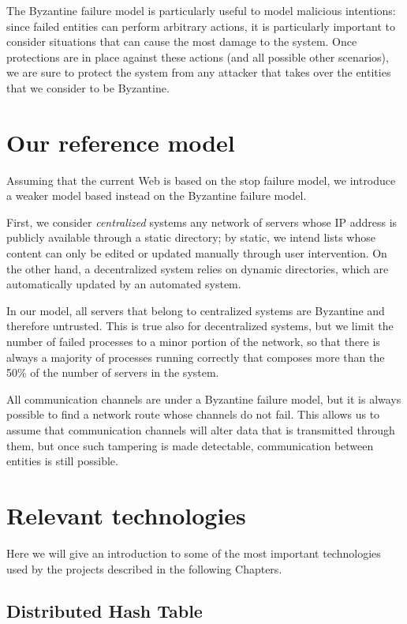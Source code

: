 \documentclass[mscthesis]{usiinfthesis}
\begin{document}
The Byzantine failure model is particularly useful to model malicious intentions: since failed entities can perform arbitrary actions, it is particularly important to consider situations that can cause the most damage to the system. Once protections are in place against these actions (and all possible other scenarios), we are sure to protect the system from any attacker that takes over the entities that we consider to be Byzantine.

\section{Our reference model}\label{sec:model}

Assuming that the current Web is based on the stop failure model, we introduce a weaker model based instead on the Byzantine failure model.

First, we consider \emph{centralized} systems any network of servers whose IP address is publicly available through a static directory; by static, we intend lists whose content can only be edited or updated manually through user intervention. On the other hand, a decentralized system relies on dynamic directories, which are automatically updated by an automated system.

In our model, all servers that belong to centralized systems are Byzantine and therefore untrusted. This is true also for decentralized systems, but we limit the number of failed processes to a minor portion of the network, so that there is always a majority of processes running correctly that composes more than the 50\% of the number of servers in the system.

All communication channels are under a Byzantine failure model, but it is always possible to find a network route whose channels do not fail. This allows us to assume that communication channels will alter data that is transmitted through them, but once such tampering is made detectable, communication between entities is still possible.

\section{Relevant technologies}

Here we will give an introduction to some of the most important technologies used by the projects described in the following Chapters.

\subsection{Distributed Hash Table}\label{tech:dht}
\end{document}
